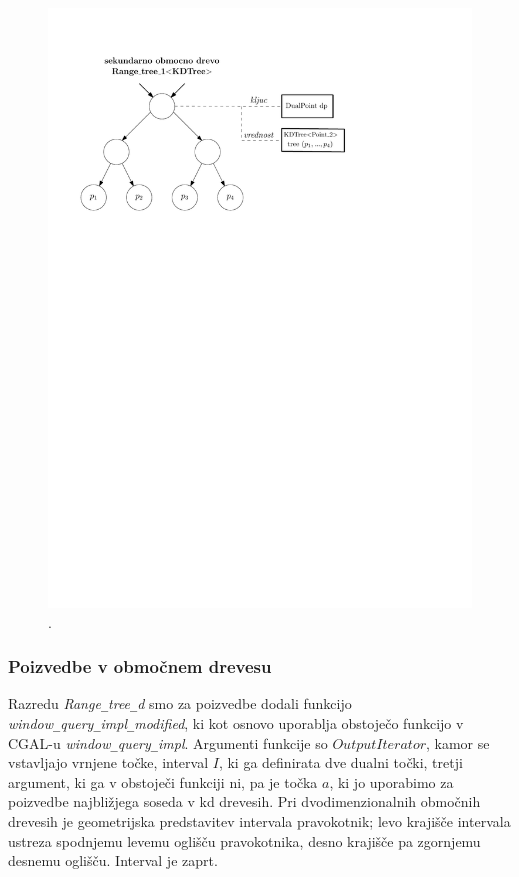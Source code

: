\documentclass[a4paper, 12pt]{book}
\newcommand{\U}{\texttt{\_}}
\begin{document}
\begin{figure}
\centerline{\includegraphics[scale=0.75]{pics/range-dual-kd.pdf}}
\caption{. }
\label{range-dual-kd}
\end{figure}

\subsubsection{Poizvedbe v območnem drevesu}
Razredu \textit{Range\U tree\U d} smo za poizvedbe dodali funkcijo \textit{window\U que\-ry\U impl\U mo\-di\-fied}, ki  kot osnovo uporablja obstoječo funkcijo v CGAL-u \textit{window\U query\U impl}. Argumenti funkcije so $OutputIterator$, kamor se vstavljajo vrnjene točke, interval $I$, ki ga definirata dve dualni točki, tretji argument, ki ga v obstoječi funkciji ni, pa je točka $a$, ki jo uporabimo za poizvedbe najbližjega soseda v kd drevesih. Pri dvodimenzionalnih območnih drevesih je geometrijska predstavitev intervala pravokotnik; levo krajišče intervala ustreza spodnjemu levemu oglišču pravokotnika, desno krajišče pa zgornjemu desnemu oglišču. Interval je zaprt. 
\end{document}
